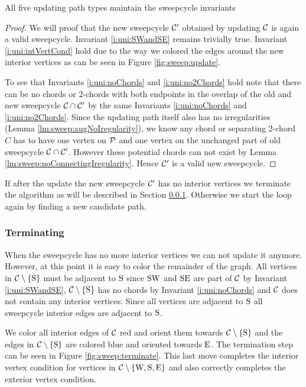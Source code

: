     \begin{lemma}
      \label{lm:sweep:updateMaintainsInvariants}
      All five updating path types maintain the sweepcycle invariants
    \end{lemma}
    \begin{proof}
      We will proof that the new sweepcycle $\C'$ obtained by updating $\C$ is again a valid sweepcycle. Invariant \ref{i:uni:SWandSE} remains trivially true. Invariant \ref{i:uni:intVertCond} hold due to the way we colored the edges around the new interior vertices as can be seen in Figure \ref{fig:sweep:update}.

      To see that Invariants \ref{i:uni:noChords} and \ref{i:uni:no2Chords} hold note that there can be no chords or $2$-chords with both endpoints in the overlap of the old and new sweepcycle $\C \cap \C'$ by the same Invariants \ref{i:uni:noChords} and \ref{i:uni:no2Chords}. Since the updating path itself also has no irregularities (Lemma \ref{lm:sweep:augNoIregularity}),
      we know any chord or separating $2$-chord $C$ has to have one vertex on $\P$ and one vertex on the unchanged part of old sweepcycle $\C \cap \C'$.
      However these potential chords can not exist by Lemma \ref{lm:sweep:noConnectingIregularity}.
      Hence $\C'$ is a valid new sweepcycle.
    \end{proof}

    If after the update the new sweepcycle $\C'$ has no interior vertices we terminate the algorithm as will be described in Section \ref{sss:terminating}. Otherwise we start the loop again by finding a new candidate path.

  \subsubsection{Terminating}
    \label{sss:terminating}
    When the sweepcycle has no more interior vertices we can not update it anymore.
    However, at this point it is easy to color the remainder of the graph.
    All vertices in $\cpath$ must be adjacent to $\pS$ since $\pS \pW$ and $\pS \pE$ are part of $\C$ by Invariant \ref{i:uni:SWandSE}, $\cpath$ has no chords by Invariant \ref{i:uni:noChords} and $\C$ does not contain any interior vertices. Since all vertices are adjacent to $\pS$ all sweepcycle interior edges are adjacent to $\pS$.

    We color all interior edges of $\C$ red and orient them towards $\cpath$ and the edges in $\cpath$ are colored blue and oriented towards $\pE$. The termination step can be seen in Figure \ref{fig:sweep:terminate}. This last move completes the interior vertex condition for vertices in $\C \sm {\pW, \pS, \pE}$ and also correctly completes the exterior vertex condition.


